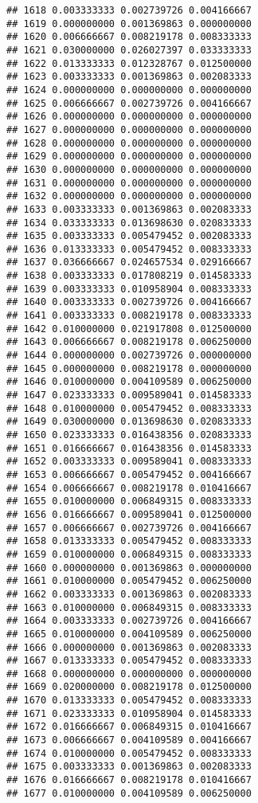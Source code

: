 \documentclass[
]{article}
\begin{document}
\begin{verbatim}
## 1618 0.003333333 0.002739726 0.004166667
## 1619 0.000000000 0.001369863 0.000000000
## 1620 0.006666667 0.008219178 0.008333333
## 1621 0.030000000 0.026027397 0.033333333
## 1622 0.013333333 0.012328767 0.012500000
## 1623 0.003333333 0.001369863 0.002083333
## 1624 0.000000000 0.000000000 0.000000000
## 1625 0.006666667 0.002739726 0.004166667
## 1626 0.000000000 0.000000000 0.000000000
## 1627 0.000000000 0.000000000 0.000000000
## 1628 0.000000000 0.000000000 0.000000000
## 1629 0.000000000 0.000000000 0.000000000
## 1630 0.000000000 0.000000000 0.000000000
## 1631 0.000000000 0.000000000 0.000000000
## 1632 0.000000000 0.000000000 0.000000000
## 1633 0.003333333 0.001369863 0.002083333
## 1634 0.033333333 0.013698630 0.020833333
## 1635 0.003333333 0.005479452 0.002083333
## 1636 0.013333333 0.005479452 0.008333333
## 1637 0.036666667 0.024657534 0.029166667
## 1638 0.003333333 0.017808219 0.014583333
## 1639 0.003333333 0.010958904 0.008333333
## 1640 0.003333333 0.002739726 0.004166667
## 1641 0.003333333 0.008219178 0.008333333
## 1642 0.010000000 0.021917808 0.012500000
## 1643 0.006666667 0.008219178 0.006250000
## 1644 0.000000000 0.002739726 0.000000000
## 1645 0.000000000 0.008219178 0.000000000
## 1646 0.010000000 0.004109589 0.006250000
## 1647 0.023333333 0.009589041 0.014583333
## 1648 0.010000000 0.005479452 0.008333333
## 1649 0.030000000 0.013698630 0.020833333
## 1650 0.023333333 0.016438356 0.020833333
## 1651 0.016666667 0.016438356 0.014583333
## 1652 0.003333333 0.009589041 0.008333333
## 1653 0.006666667 0.005479452 0.004166667
## 1654 0.006666667 0.008219178 0.010416667
## 1655 0.010000000 0.006849315 0.008333333
## 1656 0.016666667 0.009589041 0.012500000
## 1657 0.006666667 0.002739726 0.004166667
## 1658 0.013333333 0.005479452 0.008333333
## 1659 0.010000000 0.006849315 0.008333333
## 1660 0.000000000 0.001369863 0.000000000
## 1661 0.010000000 0.005479452 0.006250000
## 1662 0.003333333 0.001369863 0.002083333
## 1663 0.010000000 0.006849315 0.008333333
## 1664 0.003333333 0.002739726 0.004166667
## 1665 0.010000000 0.004109589 0.006250000
## 1666 0.000000000 0.001369863 0.002083333
## 1667 0.013333333 0.005479452 0.008333333
## 1668 0.000000000 0.000000000 0.000000000
## 1669 0.020000000 0.008219178 0.012500000
## 1670 0.013333333 0.005479452 0.008333333
## 1671 0.023333333 0.010958904 0.014583333
## 1672 0.016666667 0.006849315 0.010416667
## 1673 0.006666667 0.004109589 0.004166667
## 1674 0.010000000 0.005479452 0.008333333
## 1675 0.003333333 0.001369863 0.002083333
## 1676 0.016666667 0.008219178 0.010416667
## 1677 0.010000000 0.004109589 0.006250000

\end{verbatim}
\end{document}
